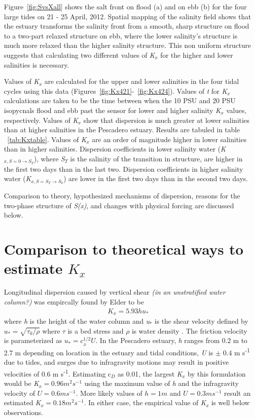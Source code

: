 Figure~\ref{fig:SvsXall} shows the salt front on flood (a) and on ebb (b) for the four large tides on 21 - 25 April, 2012. Spatial mapping of the salinity field shows that the estuary transforms  the salinity front from a smooth, sharp structure on flood to a two-part relaxed structure on ebb, where the lower salinity's structure is much more relaxed than the higher salinity structure. This non uniform structure suggests that calculating two different values of \emph{K$_x$} for the higher and lower salinities is necessary.

Values of \emph{K$_x$} are calculated for the upper and lower salinities in the four tidal cycles using this data (Figures~\ref{fig:Kx421}-~\ref{fig:Kx424}). Values of \emph{t} for \emph{K$_x$} calculations are taken to be the time between when the 10 PSU and 20 PSU isopycnals flood and ebb past the sensor for lower and higher salinity \emph{K$_x$} values, respectively. Values of \emph{K$_x$} show that dispersion is much greater at lower salinities than at higher salinities in the Pescadero estuary. Results are tabuled in table ~\ref{tab:Kxtable}. Values of \emph{K$_x$} are an order of magnitude higher in lower salinities than in higher salinities. Dispersion coefficients in lower salinity water (\emph{K$_{x,S=0 \rightarrow S_T}$}), where \emph{S$_T$} is the salinity of the transition in structure, are higher in the first two days than in the last two. Dispersion coefficients in higher salinity water (\emph{K$_{x,S=S_T \rightarrow S_0}$}) are lower in the first two days than in the second two days. 

Comparison to theory, hypothesized mechanisms of dispersion, reasons for the two-phase structure of \emph{S(x)}, and changes with physical forcing are discussed below. 

\section{Comparison to theoretical ways to estimate $K_x$}

Longitudinal dispersion caused by vertical shear \emph{(in an unstratified water column?)} was empircally found by Elder to be
\begin{eqnarray}
K_x = 5.93hu_* \label{eq:Kshear}
\end{eqnarray}
where \emph{h} is the height of the water column and \emph{u$_*$} is the shear velocity defined by $u_*=\sqrt{\tau_0/\rho}$ where $\tau$ is a bed stress and $\rho$ is water density \parencite*{elder_dispersion_1959}. The friction velocity is parameterized as $u_* = c_{_D}^{1/2}U$. In the Pescadero estuary, \emph{h} ranges from 0.2 m to 2.7 m depending on location in the estuary and tidal conditions, \emph{U} is $\pm$ 0.4 m s\textsuperscript{-1} due to tides, and surges due to infragravity motions may result in positive velocities of 0.6 m s\textsuperscript{-1}. Estimating c$_D$ as 0.01, the largest \emph{K$_x$} by this formulation would be \emph{K$_x = 0.96 m^2 s^{-1}$} using the maximum value of \emph{h} and the infragravity velocity of $U = 0.6 m s^{-1}$. More likely values of $h = 1 m$ and $U = 0.3 m s^{-1}$ result an estimated \emph{K$_x = 0.18 m^2 s^{-1}$}. In either case, the empirical value of \emph{K$_x$} is well below observations.


